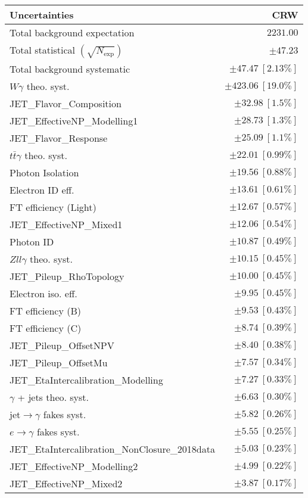 \begin{tabular}{lr}
\hline
\textbf{Uncertainties} & \textbf{CRW} \\
\hline
Total background expectation & $2231.00$ \\
\hline
Total statistical $(\sqrt{N_\mathrm{exp}})$ & $\pm 47.23$ \\
Total background systematic & $\pm 47.47\ [2.13\%]$ \\
\hline
\hline
$W\gamma$ theo. syst. & $\pm 423.06\ [19.0\%]$ \\
JET\_Flavor\_Composition & $\pm 32.98\ [1.5\%]$ \\
JET\_EffectiveNP\_Modelling1 & $\pm 28.73\ [1.3\%]$ \\
JET\_Flavor\_Response & $\pm 25.09\ [1.1\%]$ \\
$t\bar{t}\gamma$ theo. syst. & $\pm 22.01\ [0.99\%]$ \\
Photon Isolation & $\pm 19.56\ [0.88\%]$ \\
Electron ID eff. & $\pm 13.61\ [0.61\%]$ \\
FT efficiency (Light) & $\pm 12.67\ [0.57\%]$ \\
JET\_EffectiveNP\_Mixed1 & $\pm 12.06\ [0.54\%]$ \\
Photon ID & $\pm 10.87\ [0.49\%]$ \\
$Zll\gamma$ theo. syst. & $\pm 10.15\ [0.45\%]$ \\
JET\_Pileup\_RhoTopology & $\pm 10.00\ [0.45\%]$ \\
Electron iso. eff. & $\pm 9.95\ [0.45\%]$ \\
FT efficiency (B) & $\pm 9.53\ [0.43\%]$ \\
FT efficiency (C) & $\pm 8.74\ [0.39\%]$ \\
JET\_Pileup\_OffsetNPV & $\pm 8.40\ [0.38\%]$ \\
JET\_Pileup\_OffsetMu & $\pm 7.57\ [0.34\%]$ \\
JET\_EtaIntercalibration\_Modelling & $\pm 7.27\ [0.33\%]$ \\
$\gamma$ + jets theo. syst. & $\pm 6.63\ [0.30\%]$ \\
jet$\to\gamma$ fakes syst. & $\pm 5.82\ [0.26\%]$ \\
$e\to\gamma$ fakes syst. & $\pm 5.55\ [0.25\%]$ \\
JET\_EtaIntercalibration\_NonClosure\_2018data & $\pm 5.03\ [0.23\%]$ \\
JET\_EffectiveNP\_Modelling2 & $\pm 4.99\ [0.22\%]$ \\
JET\_EffectiveNP\_Mixed2 & $\pm 3.87\ [0.17\%]$ \\

\end{tabular}
